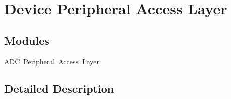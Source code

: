 \hypertarget{group___peripheral__access__layer}{}\section{Device Peripheral Access Layer}
\label{group___peripheral__access__layer}
\subsection*{Modules}
\begin{DoxyCompactItemize}
\item 
\mbox{\hyperlink{group___a_d_c___peripheral___access___layer}{A\+D\+C Peripheral Access Layer}}
\end{DoxyCompactItemize}


\subsection{Detailed Description}
